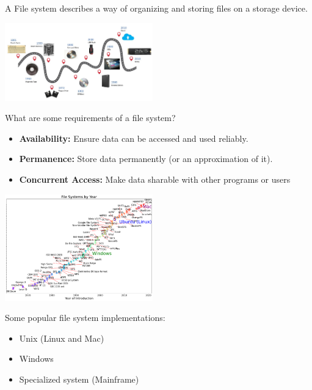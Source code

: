 \begin{slide}


    A File system describes a way of organizing and storing files on a storage device.

    \includegraphics[width=64mm]{file-system-hardware.jpg}
    
    What are some requirements of a file system?
    \begin{itemize}
        \item \textbf{Availability:} Ensure data can be accessed and used reliably.
        \item \textbf{Permanence:} Store data permanently (or an approximation of it).
        \item \textbf{Concurrent Access:} Make data sharable with other programs or users
    \end{itemize}

\end{slide}

\begin{slide}


    \includegraphics[width=64mm]{file-system-implementation.png}
    
    Some popular file system implementations: 
    \begin{itemize}
        \item Unix (Linux and Mac)
        \item Windows
        \item Specialized system (Mainframe)
    \end{itemize}

\end{slide}

\begin{slide}

\end{slide}


